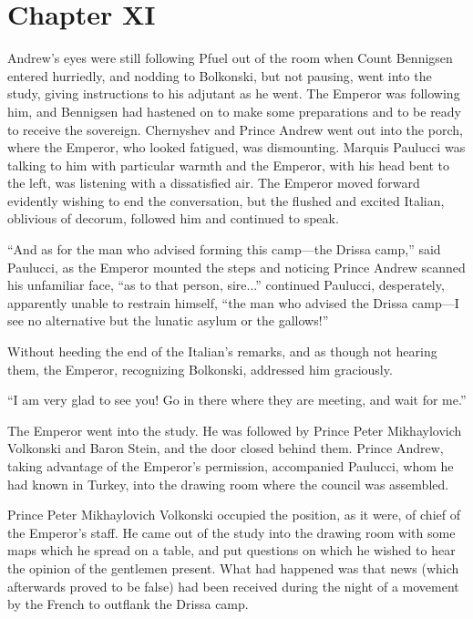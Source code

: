 \chapter*{Chapter XI}
\ifaudio     
{} 
\fi

 Andrew's eyes were still following Pfuel out of the room
when Count Bennigsen entered hurriedly, and nodding to Bolkonski,
but not pausing, went into the study, giving instructions to his
adjutant as he went. The Emperor was following him, and Bennigsen
had hastened on to make some preparations and to be ready to
receive the sovereign.  Chernyshev and Prince Andrew went out
into the porch, where the Emperor, who looked fatigued, was
dismounting. Marquis Paulucci was talking to him with particular
warmth and the Emperor, with his head bent to the left, was
listening with a dissatisfied air. The Emperor moved forward
evidently wishing to end the conversation, but the flushed and
excited Italian, oblivious of decorum, followed him and continued
to speak.

``And as for the man who advised forming this camp---the Drissa
camp,'' said Paulucci, as the Emperor mounted the steps and
noticing Prince Andrew scanned his unfamiliar face, ``as to that
person, sire...''  continued Paulucci, desperately, apparently
unable to restrain himself, ``the man who advised the Drissa
camp---I see no alternative but the lunatic asylum or the
gallows!''

Without heeding the end of the Italian's remarks, and as though
not hearing them, the Emperor, recognizing Bolkonski, addressed
him graciously.

``I am very glad to see you! Go in there where they are meeting,
and wait for me.''

The Emperor went into the study. He was followed by Prince Peter
Mikhaylovich Volkonski and Baron Stein, and the door closed
behind them.  Prince Andrew, taking advantage of the Emperor's
permission, accompanied Paulucci, whom he had known in Turkey,
into the drawing room where the council was assembled.

Prince Peter Mikhaylovich Volkonski occupied the position, as it
were, of chief of the Emperor's staff. He came out of the study
into the drawing room with some maps which he spread on a table,
and put questions on which he wished to hear the opinion of the
gentlemen present. What had happened was that news (which
afterwards proved to be false) had been received during the night
of a movement by the French to outflank the Drissa camp.

